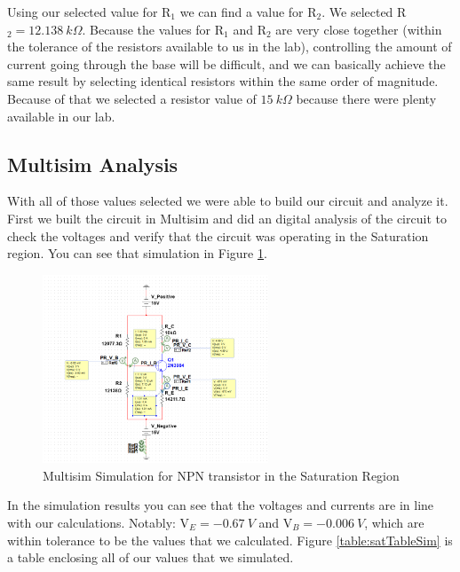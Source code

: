 \documentclass{article}
\begin{document}
Using our selected value for R$_1$ we can find a value
for R$_2$.  We selected R$_2=\SI{12.138}{k \Omega}$.
Because the values for R$_1$ and R$_2$ are very close
together (within the tolerance of the resistors available
to us in the lab), controlling the amount of current
going through the base will be difficult, and we can
basically achieve the same result by selecting identical
resistors within the same order of magnitude. Because
of that we selected a resistor value of $\SI{15}{k \Omega}$
because there were plenty available in our lab.

\subsection{Multisim Analysis}

With all of those values selected we were able to build
our circuit and analyze it. First we built the circuit in
Multisim and did an digital analysis of the circuit to
check the voltages and verify that the circuit was 
operating in the Saturation region. You can see that simulation
in Figure \ref{fig:multisimPart2}.

\begin{figure}[h!]
  \begin{center}
  \includegraphics[width=0.6\textwidth]{Multisim Simulation Image.png}
  \caption{Multisim Simulation for NPN transistor
  in the Saturation Region}
  \label{fig:multisimPart2}
  \end{center}
\end{figure}

In the simulation results you can see that the voltages
and currents are in line with our calculations.
Notably: V$_E=\SI{-0.67}{V}$ and V$_B=\SI{-0.006}{V}$,
which are within tolerance to be the values that
we calculated. Figure \ref{table:satTableSim} is
a table enclosing all of our values that we simulated.
\end{document}
